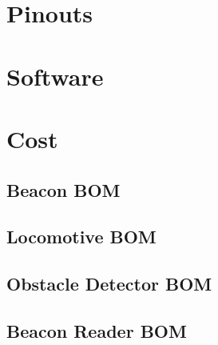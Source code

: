 \documentclass[openbib,letterpaper,10pt]{article}
\begin{document}
\begin{spacing}{1.15}
\begin{appendix}
\clearpage

\section{Pinouts}

\clearpage

\section{Software}

\clearpage

\section{Cost}

\subsection{Beacon BOM}

\subsection{Locomotive BOM}

\subsection{Obstacle Detector BOM}

\subsection{Beacon Reader BOM}

\end{appendix}


\end{spacing}
\end{document}
